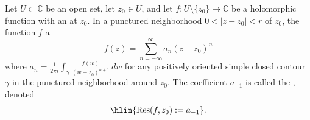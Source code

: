 \begin{definition} \label{definition:residue_of_a_holomorphic_function_at_an_isolated_singularity_defined_as_the_coefficient_of_z_minus_z_0_to_the_negative_1_in_its_laurent_expansion}
Let $U \subset \mathbb{C}$ be an open set, let $z_0 \in U$, and let $f : U \setminus \{z_0\} \to \mathbb{C}$ be a holomorphic function with an  at $z_0$. 
In a punctured neighborhood $0 < |z - z_0| < r$ of $z_0$, the function $f$  a 
$$f(z) = \sum_{n=-\infty}^{\infty} a_n (z - z_0)^n$$
where $a_n = \frac{1}{2\pi i} \int_{\gamma} \frac{f(w)}{(w - z_0)^{n+1}}\,dw$ for any positively oriented simple closed contour $\gamma$ in the punctured neighborhood around $z_0$. The coefficient $a_{-1}$ is called the , denoted
$$\hlin{\operatorname{Res}(f, z_0) := a_{-1}}.$$
\end{definition}
